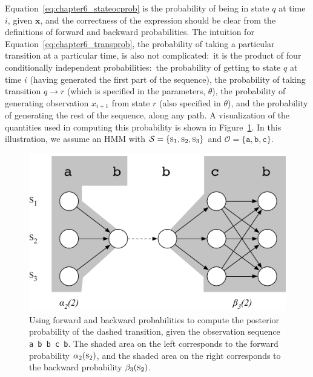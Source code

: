 \noindent Equation~\ref{eq:chapter6_stateocprob} is the probability of
being in state $q$ at time $i$, given $\textbf{x}$, and the
correctness of the expression should be clear from the definitions of
forward and backward probabilities.  The intuition for
Equation~\ref{eq:chapter6_transprob}, the probability of taking a
particular transition at a particular time, is also not
complicated:\ it is the product of four conditionally independent
probabilities:\ the probability of getting to state $q$ at time $i$
(having generated the first part of the sequence), the probability of
taking transition $q \rightarrow r$ (which is specified in the
parameters, $\theta$), the probability of generating observation
$x_{i+1}$ from state $r$ (also specified in $\theta$), and the
probability of generating the rest of the sequence, along any path.  A
visualization of the quantities used in computing this probability is
shown in Figure~\ref{chapter6_forwardbackward}.  In this illustration,
we assume an HMM with $\mathcal{S} = \{ \textsc{s}_1, \textsc{s}_2,
\textsc{s}_3 \}$ and $\mathcal{O}=\{\texttt{a}, \texttt{b}, \texttt{c}
\}$.

\begin{figure}[t]
\begin{center}
\vspace{0.2cm}
\includegraphics[scale=0.55]{figures/fig-ch6-HMM-forward-backward.pdf}
\vspace{-0.3cm}
\end{center}\caption{Using forward and backward probabilities to compute the posterior probability of the dashed transition, given the observation sequence {\tt a b b c b}.  The shaded area on the left corresponds to the forward probability $\alpha_{2}(\textsc{s}_2)$, and the shaded area on the right corresponds to the backward probability $\beta_3(\textsc{s}_2)$.}\label{chapter6_forwardbackward}
\end{figure}

